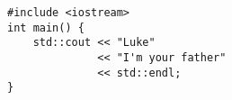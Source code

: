 \documentclass[12pt,a4paper, oneside]{report}
\begin{document}
\begin{verbatim}
#include <iostream>
int main() {
    std::cout << "Luke"
              << "I'm your father"
              << std::endl;
}               
\end{verbatim}
\end{document}
